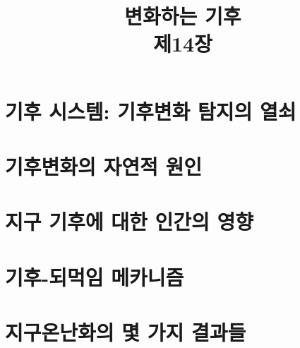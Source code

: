 \title[]{변화하는 기후\\\small{제14장}}

\begin{frame}[plain] %
	\titlepage
\end{frame}


\section{기후 시스템: 기후변화 탐지의 열쇠}


\section{기후변화의 자연적 원인}

\section{지구 기후에 대한 인간의 영향}

\section{기후-되먹임 메카니즘}

\section{지구온난화의 몇 가지 결과들}


